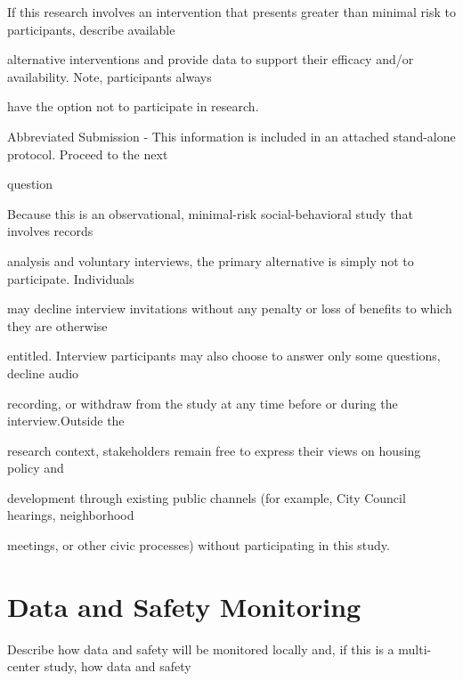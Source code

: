 \documentclass[10pt, letterpaper]{article}
\begin{document}
If this research involves an intervention that presents greater than minimal risk to participants, describe available

alternative interventions and provide data to support their efficacy and/or availability. Note, participants always

have the option not to participate in research.

\noindent \makebox[0pt][l]{$\square$}\hspace{1.2em} Abbreviated Submission - This information is included in an attached stand-alone protocol. Proceed to the next

\begin{responsebox}

question

\vspace{0.5em}

\vspace{0.5em}

\vspace{0.5em}

Because this is an observational, minimal-risk social-behavioral study that involves records

\end{responsebox}

analysis and voluntary interviews, the primary alternative is simply not to participate. Individuals

may decline interview invitations without any penalty or loss of benefits to which they are otherwise

entitled. Interview participants may also choose to answer only some questions, decline audio

recording, or withdraw from the study at any time before or during the interview.Outside the

research context, stakeholders remain free to express their views on housing policy and

development through existing public channels (for example, City Council hearings, neighborhood

meetings, or other civic processes) without participating in this study.

\vspace{0.5em}

\section*{Data and Safety Monitoring}

Describe how data and safety will be monitored locally and, if this is a multi-center study, how data and safety
\end{document}
